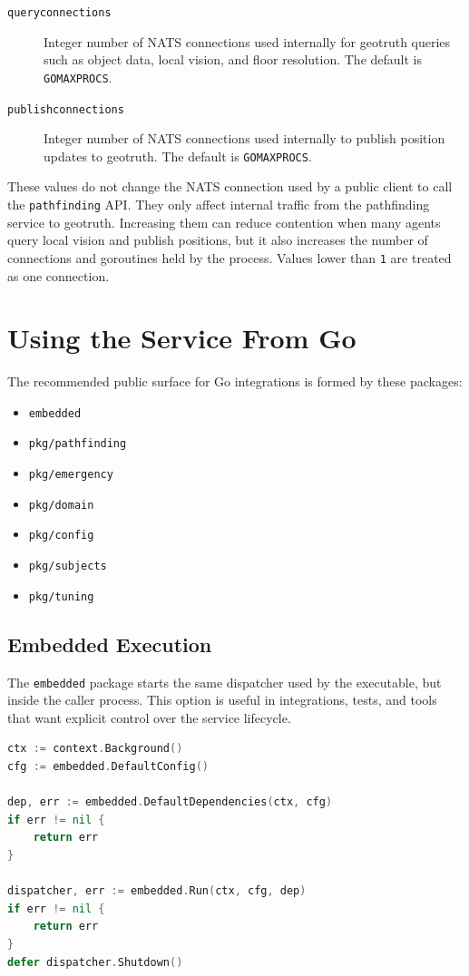 \documentclass[12pt,a4paper]{report}
\begin{document}
\begin{description}
\item[\texttt{queryconnections}] Integer number of NATS connections used
internally for geotruth queries such as object data, local vision, and floor
resolution. The default is \texttt{GOMAXPROCS}.
\item[\texttt{publishconnections}] Integer number of NATS connections used
internally to publish position updates to geotruth. The default is
\texttt{GOMAXPROCS}.
\end{description}

These values do not change the NATS connection used by a public client to call
the \texttt{pathfinding} API. They only affect internal traffic from the
pathfinding service to geotruth. Increasing them can reduce contention when many
agents query local vision and publish positions, but it also increases the
number of connections and goroutines held by the process. Values lower than
\texttt{1} are treated as one connection.

\section{Using the Service From Go}

The recommended public surface for Go integrations is formed by these packages:

\begin{itemize}
\item \texttt{embedded}
\item \texttt{pkg/pathfinding}
\item \texttt{pkg/emergency}
\item \texttt{pkg/domain}
\item \texttt{pkg/config}
\item \texttt{pkg/subjects}
\item \texttt{pkg/tuning}
\end{itemize}

\subsection{Embedded Execution}

The \texttt{embedded} package starts the same dispatcher used by the executable,
but inside the caller process. This option is useful in integrations, tests, and
tools that want explicit control over the service lifecycle.

\begin{lstlisting}[language=Go]
ctx := context.Background()
cfg := embedded.DefaultConfig()

dep, err := embedded.DefaultDependencies(ctx, cfg)
if err != nil {
    return err
}

dispatcher, err := embedded.Run(ctx, cfg, dep)
if err != nil {
    return err
}
defer dispatcher.Shutdown()
\end{lstlisting}
\end{document}
